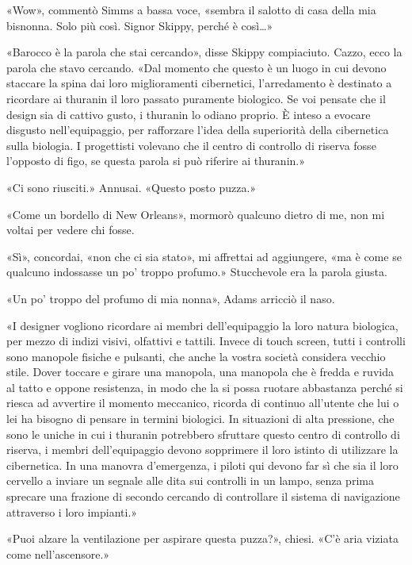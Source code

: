 «Wow», commentò Simms a bassa voce, «sembra il salotto di casa della mia
bisnonna. Solo più così. Signor Skippy, perché è così\ldots»

«Barocco è la parola che stai cercando», disse Skippy compiaciuto.
Cazzo, ecco la parola che stavo cercando. «Dal momento che questo è un
luogo in cui devono staccare la spina dai loro miglioramenti
cibernetici, l'arredamento è destinato a ricordare ai thuranin il loro
passato puramente biologico. Se voi pensate che il design sia di cattivo
gusto, i thuranin lo odiano proprio. È inteso a evocare disgusto
nell'equipaggio, per rafforzare l'idea della superiorità della
cibernetica sulla biologia. I progettisti volevano che il centro di
controllo di riserva fosse l'opposto di figo, se questa parola si può
riferire ai thuranin.»

«Ci sono riusciti.» Annusai. «Questo posto puzza.»

«Come un bordello di New Orleans», mormorò qualcuno dietro di me, non mi
voltai per vedere chi fosse.

«Sì», concordai, «non che ci sia stato», mi affrettai ad aggiungere, «ma
è come se qualcuno indossasse un po' troppo profumo.» Stucchevole era la
parola giusta.

«Un po' troppo del profumo di mia nonna», Adams arricciò il naso.

«I designer vogliono ricordare ai membri dell'equipaggio la loro natura
biologica, per mezzo di indizi visivi, olfattivi e tattili. Invece di
touch screen, tutti i controlli sono manopole fisiche e pulsanti, che
anche la vostra società considera vecchio stile. Dover toccare e girare
una manopola, una manopola che è fredda e ruvida al tatto e oppone
resistenza, in modo che la si possa ruotare abbastanza perché si riesca
ad avvertire il momento meccanico, ricorda di continuo all'utente che
lui o lei ha bisogno di pensare in termini biologici. In situazioni di
alta pressione, che sono le uniche in cui i thuranin potrebbero
sfruttare questo centro di controllo di riserva, i membri
dell'equipaggio devono sopprimere il loro istinto di utilizzare la
cibernetica. In una manovra d'emergenza, i piloti qui devono far sì che
sia il loro cervello a inviare un segnale alle dita sui controlli in un
lampo, senza prima sprecare una frazione di secondo cercando di
controllare il sistema di navigazione attraverso i loro impianti.»

«Puoi alzare la ventilazione per aspirare questa puzza?», chiesi. «C'è
aria viziata come nell'ascensore.»

